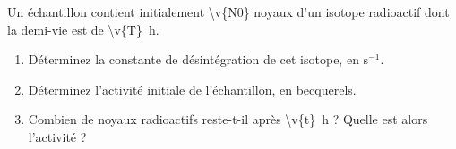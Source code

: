 Un échantillon contient initialement \num{\v{N0}} noyaux d'un isotope radioactif dont la demi-vie est de \qty{\v{T}}{h}.

\begin{enumerate}[label=\alph*)]
    \item Déterminez la constante de désintégration de cet isotope, en $\mathrm{s^{-1}}$.
    \item Déterminez l'activité initiale de l'échantillon, en becquerels.
    \item Combien de noyaux radioactifs reste-t-il après \qty{\v{t}}{h} ? Quelle est alors l'activité ?
\end{enumerate}
